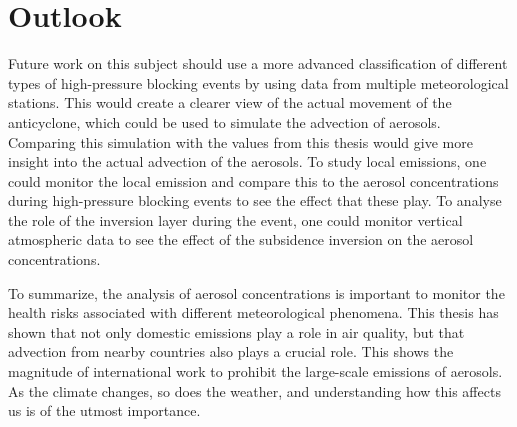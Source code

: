 \section{Outlook}
Future work on this subject should use a more advanced classification of different types of high-pressure blocking events by using data from multiple meteorological stations. This would create a clearer view of the actual movement of the anticyclone, which could be used to simulate the advection of aerosols. Comparing this simulation with the values from this thesis would give more insight into the actual advection of the aerosols. To study local emissions, one could monitor the local emission and compare this to the aerosol concentrations during high-pressure blocking events to see the effect that these play. To analyse the role of the inversion layer during the event, one could monitor vertical atmospheric data to see the effect of the subsidence inversion on the aerosol concentrations.

To summarize, the analysis of aerosol concentrations is important to monitor the health risks associated with different meteorological phenomena. This thesis has shown that not only domestic emissions play a role in air quality, but that advection from nearby countries also plays a crucial role. This shows the magnitude of international work to prohibit the large-scale emissions of aerosols. As the climate changes, so does the weather, and understanding how this affects us is of the utmost importance.

